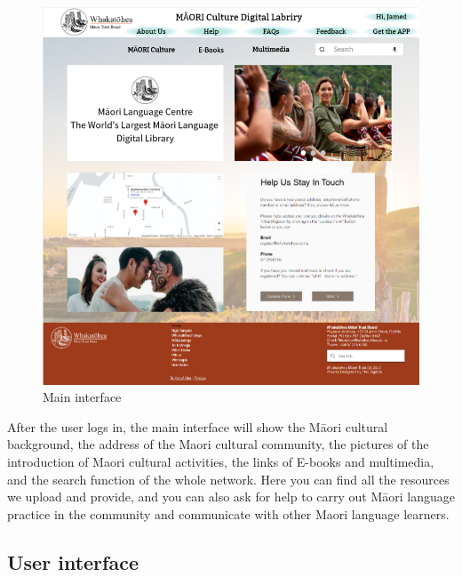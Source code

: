 \begin{figure}[htbp]
  \centerline{\includegraphics[width=400pt]{images/3-1-1.png}}
  \caption{Main interface}
  \label{fig30}
\end{figure}

After the user logs in, the main interface will show the Māori cultural background, the address of the Maori cultural community, the pictures of the introduction of Maori cultural activities, the links of E-books and multimedia, and the search function of the whole network. Here you can find all the resources we upload and provide, and you can also ask for help to carry out Māori language practice in the community and communicate with other Maori language learners.

\subsection{User interface}

